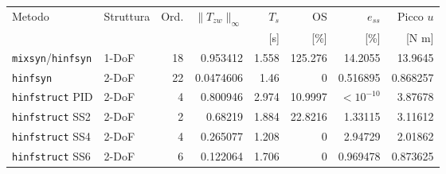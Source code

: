 \begin{tabular}{llrrrrrr}\toprule
Metodo & Struttura & Ord. & $\|T_{zw}\|_\infty$ & $T_s$ & OS & $e_{ss}$ & Picco $u$\\
 & & & & [s] & [\%] & [\%] & [N m]\\\midrule
\texttt{mixsyn}/\texttt{hinfsyn} & 1-DoF & 18 & 0.953412 & 1.558 & 125.276 & 14.2055 & 13.9645 \\
\texttt{hinfsyn} & 2-DoF & 22 & 0.0474606 & 1.46 & 0 & 0.516895 & 0.868257 \\
\texttt{hinfstruct} PID & 2-DoF & 4 & 0.800946 & 2.974 & 10.9997 & $<10^{-10}$ & 3.87678 \\
\texttt{hinfstruct} SS2 & 2-DoF & 2 & 0.68219 & 1.884 & 22.8216 & 1.33115 & 3.11612 \\
\texttt{hinfstruct} SS4 & 2-DoF & 4 & 0.265077 & 1.208 & 0 & 2.94729 & 2.01862 \\
\texttt{hinfstruct} SS6 & 2-DoF & 6 & 0.122064 & 1.706 & 0 & 0.969478 & 0.873625 \\
\bottomrule\end{tabular}
